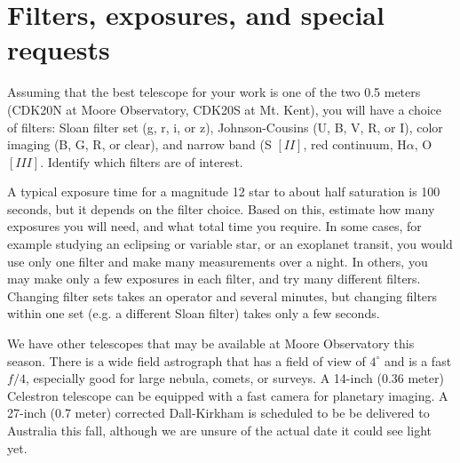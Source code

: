 \documentclass[12pt]{article}
\begin{document}
\section{Filters, exposures, and special requests}

Assuming that the best telescope for your work is one of the two 0.5 meters
(CDK20N at Moore Observatory, CDK20S at Mt. Kent), you will have a choice of
filters:  Sloan filter set (g, r, i, or z),  Johnson-Cousins (U, B, V, R, or I),
color imaging (B, G, R, or clear), and narrow band (S $[II]$, red continuum,
H$\alpha$,  O$[III]$.  Identify which filters are of interest.

A typical exposure time for a magnitude 12 star to about half saturation is 100
seconds, but it depends on the filter choice.  Based on this, estimate how many
exposures you will need, and what total time you require.  In some cases, for
example studying an eclipsing or variable star, or an exoplanet transit, you
would use only one filter and make many measurements over a night.  In others,
you may make only a few exposures in each filter, and try many different
filters.   Changing filter sets takes an operator and several minutes, but
changing filters within one set (e.g. a different Sloan filter) takes only a few
seconds.

We have other telescopes that may be available at Moore Observatory this season.
There is a wide field astrograph that has a field of view of $4^\circ$ and is a
fast $f/4$,  especially good for large nebula, comets, or surveys.  A 14-inch
(0.36 meter) Celestron  telescope can be equipped with a fast camera for
planetary imaging.  A 27-inch (0.7 meter)  corrected Dall-Kirkham is scheduled
to be be delivered to Australia this fall, although we are unsure of the actual
date it could see light yet.  




\end{document}
